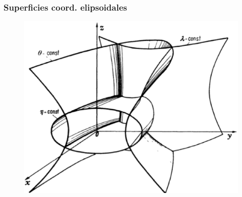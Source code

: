 \documentclass[12pt]{beamer}
\begin{document}
\begin{frame}
\frametitle{Superficies coord. elipsoidales}
\begin{figure}[H]
\centering
\includegraphics[scale=0.3]{Imagenes/Sistema_Elipsoidal.eps}
\end{figure}
\end{frame}
\end{document}
